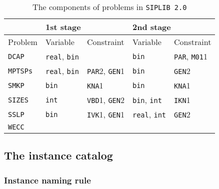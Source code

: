 \begin{table}[H]
	\centering
	\caption{The components of problems in \texttt{SIPLIB 2.0}}
	\label{table:prob_class}
	\begin{tabular}{@{}lllll@{}}
		\toprule
		& \multicolumn{2}{l}{1st stage}                              & \multicolumn{2}{l}{2nd stage}                             \\ \midrule
		Problem & Variable                    & Constraint                   & Variable                    & Constraint                  \\ \midrule
		\texttt{DCAP}    & \texttt{real}, \texttt{bin} &                              & \texttt{bin}                & \texttt{PAR}, \texttt{M01}1 \\
		\texttt{MPTSPs}  & \texttt{real}, \texttt{bin} & \texttt{PAR}2, \texttt{GEN}1 & \texttt{bin}                & \texttt{GEN}2               \\
		\texttt{SMKP}    & \texttt{bin}                & \texttt{KNA}1                & \texttt{bin}                & \texttt{KNA}1               \\
		\texttt{SIZES}   & \texttt{int} & \texttt{VBD}1, \texttt{GEN}2 & \texttt{bin}, \texttt{int} & \texttt{IKN}1               \\
		\texttt{SSLP}    & \texttt{bin}                & \texttt{IVK}1, \texttt{GEN}1 & \texttt{real}, \texttt{int} & \texttt{GEN}2               \\
		\texttt{WECC}    &                             &                              &                             &                             \\ \bottomrule
	\end{tabular}

\end{table}

\subsection{The instance catalog}

\subsubsection{Instance naming rule}

